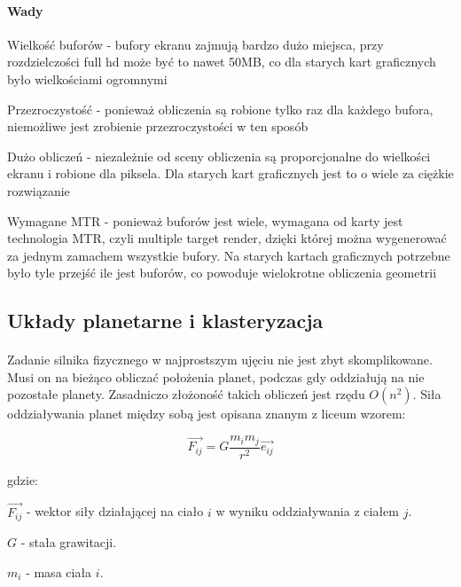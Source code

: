 \paragraph{Wady}

\begin{description}
\item{Wielkość buforów} - bufory ekranu zajmują bardzo dużo miejsca, przy rozdzielczości full hd może być to nawet 50MB, co dla starych kart graficznych było wielkościami ogromnymi
\item{Przezroczystość} - ponieważ obliczenia są robione tylko raz dla każdego bufora, niemożliwe jest zrobienie przezroczystości w ten sposób
\item{Dużo obliczeń} - niezależnie od sceny obliczenia są proporcjonalne do wielkości ekranu i robione dla piksela. Dla starych kart graficznych jest to o wiele za ciężkie rozwiązanie
\item{Wymagane MTR} - ponieważ buforów jest wiele, wymagana od karty jest technologia MTR, czyli multiple target render, dzięki której można wygenerować za jednym zamachem wszystkie bufory. Na starych kartach graficznych potrzebne było tyle przejść ile jest buforów, co powoduje wielokrotne obliczenia geometrii
\end{description}

\subsection{Układy planetarne i klasteryzacja}\label{sub:uklady planetarne}

\paragraph{}
Zadanie silnika fizycznego w najprostszym ujęciu nie jest zbyt skomplikowane. Musi on na bieżąco obliczać położenia planet, podczas gdy oddziałują na nie pozostałe planety. Zasadniczo złożoność takich obliczeń jest rzędu \ensuremath{O(n^2)}. Siła oddziaływania planet między sobą jest opisana znanym z liceum wzorem:

		$$ \overrightarrow{F_{ij}} = G\frac{m_i m_j}{r^2}\overrightarrow{e_{ij}}  $$

gdzie: 

$ \overrightarrow{F_{ij}} $ - wektor siły działającej na ciało $i$ w wyniku oddziaływania z ciałem $j$. 

$ G $ - stała grawitacji. 
 
$ m_i $ - masa ciała $i$. 

